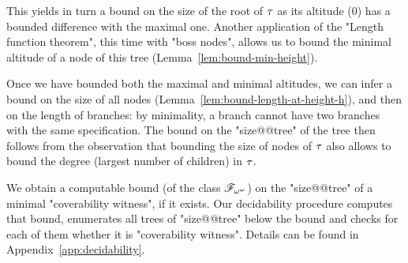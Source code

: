 This yields in turn a bound on the size of the root of $\tau$ as its altitude ($0$) has a bounded difference with the maximal one. Another application of the "Length function theorem", this time with "boss nodes", allows us to bound the minimal altitude of a node of this tree (Lemma~\ref{lem:bound-min-height}).
	
Once we have bounded both the maximal and minimal altitudes, we can infer a bound on the size of all nodes (Lemma~\ref{lem:bound-length-at-height-h}), and then on the length of branches: by minimality, a branch cannot have two branches with the same specification. 
The bound on the "size@@tree" of the tree then follows from the observation that bounding the size of nodes of $\tau$ also allows to bound the degree (largest number of children) in $\tau$.
 



We obtain a computable bound (of the class $\mathscr{F}_{\omega^\omega}$) on the "size@@tree" of a minimal "coverability witness", if it exists. Our decidability procedure computes that bound, enumerates all trees of "size@@tree" below the bound and checks for each of them whether it is "coverability witness". Details can be found in Appendix~\ref{app:decidability}.

\decidablecover*


